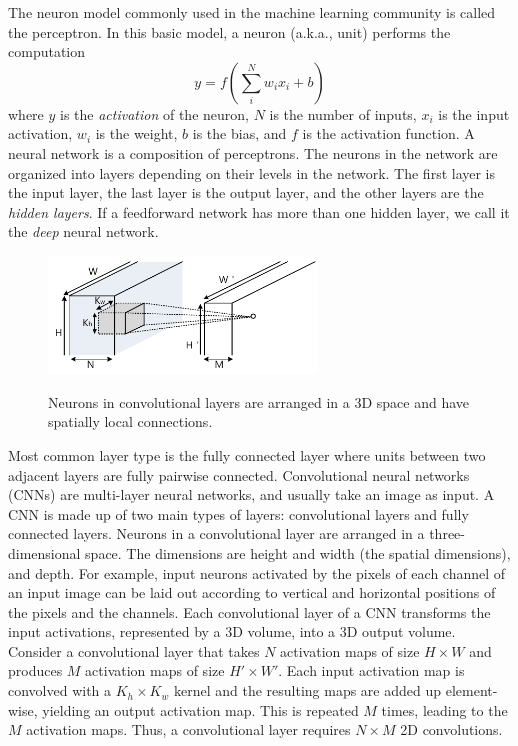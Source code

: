 \documentclass[journal]{IEEEtran}
\begin{document}
The neuron model commonly used in the machine learning community is called the perceptron. In this basic model, a neuron (a.k.a., unit) performs the computation
\begin{equation}
y = f(\sum_i^N{w_i x_i} + b)
\end{equation}
where $y$ is the \textit{activation} of the neuron, $N$ is the number of inputs, $x_i$ is the input activation, $w_i$ is the weight, $b$ is the bias, and $f$ is the activation function. A neural network is a composition of perceptrons. The neurons in the network are organized into layers depending on their levels in the network. The first layer is the input layer, the last layer is the output layer, and the other layers are the \textit{hidden layers}.
If a feedforward network has more than one hidden layer, we call it the \textit{deep} neural network.
\begin{figure}[h]
\centering
\includegraphics[width = 2.8in]{./FIGURES/fig1.pdf}\
\caption {Neurons in convolutional layers are arranged in a 3D space and have spatially local connections.} \label{cnn}
\end{figure}
Most common layer type is the fully connected layer where units between two adjacent layers are fully pairwise connected. Convolutional neural networks (CNNs) are multi-layer neural networks, and usually take an image as input. A CNN is made up of two main types of layers: convolutional layers and fully connected layers. 
Neurons in a convolutional layer are arranged in a three-dimensional space. 
The dimensions are height and width (the spatial dimensions), and depth. 
For example, input neurons activated by the pixels of each channel of an input image can be laid out according to 
vertical and horizontal positions of the pixels and the channels. 
Each convolutional layer of a CNN transforms the input activations, represented by a 3D volume, into a 3D output volume. Consider a convolutional layer that takes $N$ activation maps of size $H\times W$ and produces $M$ activation maps of size $H' \times W'$.
Each input activation map is convolved with a $K_h\times K_w$ kernel and the resulting maps are added up element-wise, yielding an output activation map. This is repeated $M$ times, leading to the $M$ activation maps. Thus, a convolutional layer requires $N\times M$ 2D convolutions. 
\end{document}
